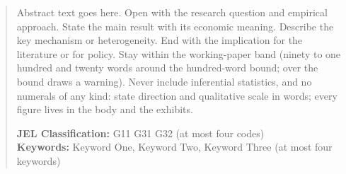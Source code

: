 \begin{abstract}
\noindent Abstract text goes here. Open with the research question and empirical approach. State the main result with its economic meaning. Describe the key mechanism or heterogeneity. End with the implication for the literature or for policy. Stay within the working-paper band (ninety to one hundred and twenty words around the hundred-word bound; over the bound draws a warning). Never include inferential statistics, and no numerals of any kind: state direction and qualitative scale in words; every figure lives in the body and the exhibits.

\bigskip
\noindent \textbf{JEL Classification:} G11 G31 G32 (at most four codes) \\
\noindent \textbf{Keywords:} Keyword One, Keyword Two, Keyword Three (at most four keywords)
\end{abstract}
